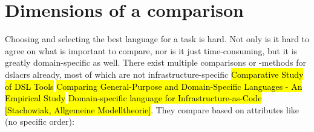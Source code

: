 \section{Dimensions of a comparison}
Choosing and selecting the best language for a task is hard. Not only is it hard to agree on what is important to compare, nor is it just time-consuming, but it is greatly domain-specific as well.
There exist multiple comparisons or -methods for \gls{dslacr}s already, most of which are not infrastructure-specific \hl{Comparative Study of DSL Tools} \hl{Comparing General-Purpose and Domain-Specific Languages - An Empirical Study} \hl{Domain-specific language for Infrastructure-as-Code} \hl{[Stachowiak, Allgemeine Modelltheorie]}. %
They compare based on attributes like (no specific order):

